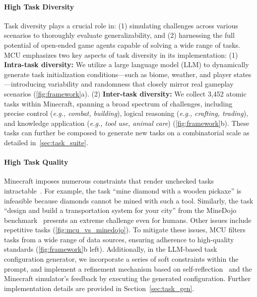 \paragraph{High Task Diversity} 
Task diversity plays a crucial role in: (1) simulating challenges across various scenarios to thoroughly evaluate generalizability, and (2) harnessing the full potential of open-ended game agents capable of solving a wide range of tasks. MCU emphasizes two key aspects of task diversity in its implementation: (1) \textbf{Intra-task diversity:} We utilize a large language model (LLM) to dynamically generate task initialization conditions—such as biome, weather, and player states—introducing variability and randomness that closely mirror real gameplay scenarios (\cref{fig:framework}a). 
(2) \textbf{Inter-task diversity:} We collect 3,452 atomic tasks within Minecraft, spanning a broad spectrum of challenges, including precise control (\emph{e.g., combat, building}), logical reasoning (\emph{e.g., crafting, trading}), and knowledge application (\emph{e.g., tool use, animal care}) (\cref{fig:framework}b). These tasks can further be composed to generate new tasks on a combinatorial scale as detailed in~\cref{sec:task_suite}.


\paragraph{High Task Quality} Minecraft imposes numerous constraints that render unchecked tasks intractable~\citep{minedojo, taskgen_constraint}. For example, the task {``mine diamond with a wooden pickaxe”} is infeasible because diamonds cannot be mined with such a tool. Similarly, the task {``design and build a transportation system for your city”} from the MineDojo benchmark~\citep{minedojo} presents an extreme challenge even for humans. Other issues include repetitive tasks (\cref{fig:mcu_vs_minedojo}). To mitigate these issues, MCU filters tasks from a wide range of data sources, ensuring adherence to high-quality standards (\cref{fig:framework}b left). Additionally, in the LLM-based task configuration generator, we incorporate a series of soft constraints within the prompt, and implement a refinement mechanism based on self-reflection~\citep{reflexion} and the Minecraft simulator's feedback by executing the generated configuration. Further implementation details are provided in Section~\ref{sec:task_gen}.


